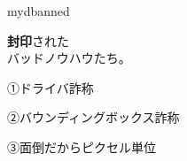 %
%



\newcommand*{\mybadbkname}[4][1]{%
  {\large\rmfamily バッド\・ノウハウ\quad その%
    {\LARGE\rmfamily #2}%
  \par}
  \myvspace{#1}
  {\hhhuge\bfseries #3\par}%
  \myvspace{#1}
  {\LARGE\rmfamily #4}%
}

\begin{mybgcolor}{mydbanned}

\newcommand*{\mybkno}[1]{{\rmfamily\LARGE#1}\quad}
\begin{myframe}
  \begin{center}\color{white}
    {\LARGE
      \textcolor{mylbanned}{\bfseries 封印}された\\
      \textcolor{mylbad}{バッド\・ノウハウ}たち。\par}
    {\Large\begin{minipage}{15em}
      \mybkno{①}ドライバ詐称
      \par{}
      \mybkno{②}バウンディングボックス詐称
      \par{}
      \mybkno{③}面倒だからピクセル単位
    \end{minipage}}
  \end{center}
\end{myframe}

\end{mybgcolor}


